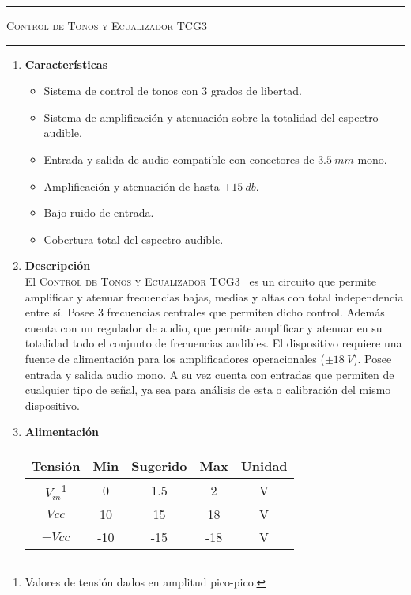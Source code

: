 



\begin{center}
\rule{\textwidth}{1pt}
\textsc{Control de Tonos y Ecualizador TCG3 \textsuperscript{\textregistered}}
\rule{\textwidth}{1pt}
\end{center}

\begin{multicols}{2}

\begin{enumerate}
	\item[1] \textbf{Características}
	\begin{itemize}
		\item Sistema de control de tonos con 3 grados de libertad.
		\item Sistema de amplificación y atenuación sobre la totalidad del espectro audible.
		\item Entrada y salida de audio compatible con conectores de $3.5 \ mm$ mono.
		\item Amplificación y atenuación de hasta $\pm 15 \ db$.
		\item Bajo ruido de entrada.
		\item Cobertura total del espectro audible.
	\end{itemize}
	
	\item[2] \textbf{Descripción}\\
		El \textsc{Control de Tonos y Ecualizador TCG3~\textsuperscript{\textregistered}} es un circuito que permite amplificar y atenuar frecuencias bajas, medias y altas con total independencia entre sí. Posee 3 frecuencias centrales que permiten dicho control. Además cuenta con un regulador de audio, que permite amplificar y atenuar en su totalidad todo el conjunto de frecuencias audibles. El dispositivo requiere una fuente de alimentación para los amplificadores operacionales ($\pm 18 \ V$). Posee entrada y salida audio mono. A su vez cuenta con entradas que permiten de cualquier tipo de señal, ya sea para análisis de esta o calibración del mismo dispositivo.
	
	\item[3] \textbf{Alimentación}
	\begin{table}[H]
		\begin{tabular}{ccccc}
			\hline	
			Tensión & Min & Sugerido & Max & Unidad \\
			\hline
			$V_{in}$\footnote{Valores de tensión dados en amplitud pico-pico.}    & 0 	& 1.5		   & 2	 	& V \\
			$Vcc$       & 10  	& 15       & 18 	& V \\
			$-Vcc$      & -10 	& -15      & -18 	& V	\\
			\hline
		\end{tabular}
	\end{table}
		

\end{enumerate}
\end{multicols}
